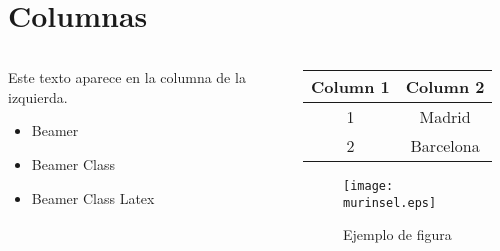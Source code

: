 \section{Columnas}

\begin{frame}

\begin{columns}

	\begin{column}{5cm}
    
		Este texto aparece en la columna de la izquierda.
		\begin{itemize}
		  \item Beamer
		  \item Beamer Class
		  \item Beamer Class Latex
		\end{itemize}
	
	\end{column}

	\begin{column}{5cm}
	

		\begin{tabular}{|c|c||}
		
		\hline
		{\bf Column 1} & {\bf Column 2} \\
		\hline
		1 & Madrid \\
		\hline
		2 & Barcelona \\
		\hline
		
		\end{tabular}

		\begin{figure}
			\texttt{[image: murinsel.eps]}
			 \caption{\label{figura1}Ejemplo de figura}
		\end{figure}	
	
	\end{column}

\end{columns}


\end{frame}
